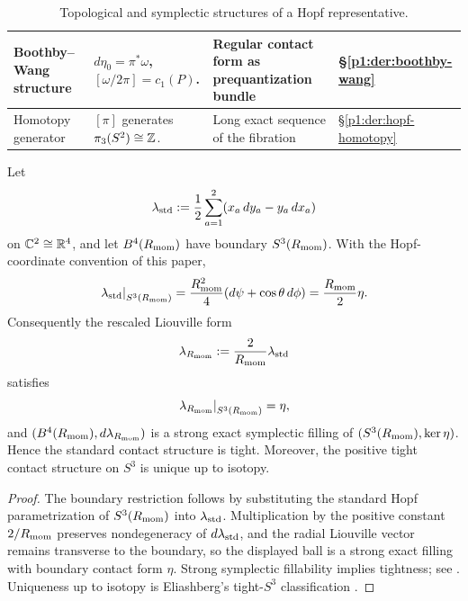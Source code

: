 \documentclass[11pt]{article}
\begin{document}
\begin{table}[p]
\begin{tabular}{|
  L{2.7cm}|
  L{\dimexpr\linewidth-2.7cm-3.5cm-2.25cm-8\arrayrulewidth\relax}|
  L{3.5cm}|
  C{2.25cm}|
}
Boothby--Wang structure
& \(d\eta_0=\pi^*\omega\), \([\omega/2\pi]=c_1(P)\).
& Regular contact form as prequantization bundle
& \S\ref{p1:der:boothby-wang} \\
\hline

Homotopy generator
& \([\pi]\) generates \(\pi_3(S^2)\cong\mathbb{Z}\).
& Long exact sequence of the fibration
& \S\ref{p1:der:hopf-homotopy} \\
\hline

\end{tabular}

\caption[Topological and symplectic structures of a Hopf representative]{Topological and symplectic structures of a Hopf representative.}
\label{p1:tab:canonical-topological}
\endgroup
\end{table}

\begin{proposition}
\label{p1:prop:standard-contact-fill-tight}
Let
\[
  \lambda_{\rm std}
  :=\frac12\sum_{a=1}^{2}(x_a\,dy_a-y_a\,dx_a)
\]
on \(\mathbb{C}^2\cong\mathbb{R}^4\), and let \(B^4(R_{\mathrm{mom}})\) have boundary
\(S^3(R_{\mathrm{mom}})\).  With the Hopf-coordinate convention of this paper,
\[
  \left.\lambda_{\rm std}\right|_{S^3(R_{\mathrm{mom}})}
  =\frac{R_{\mathrm{mom}}^2}{4}
   (d\psi+\cos\theta\,d\phi)
  =\frac{R_{\mathrm{mom}}}{2}\eta.
\]
Consequently the rescaled Liouville form
\[
  \lambda_{R_{\mathrm{mom}}}:=\frac{2}{R_{\mathrm{mom}}}\lambda_{\rm std}
\]
satisfies
\[
  \left.\lambda_{R_{\mathrm{mom}}}\right|_{S^3(R_{\mathrm{mom}})}=\eta,
\]
and \((B^4(R_{\mathrm{mom}}),d\lambda_{R_{\mathrm{mom}}})\) is a strong exact symplectic filling
of \((S^3(R_{\mathrm{mom}}),\ker\eta)\).  Hence the standard contact structure is
tight.  Moreover, the positive tight contact structure on \(S^3\) is unique
up to isotopy.
\end{proposition}

\begin{proof}
The boundary restriction follows by substituting the standard Hopf
parametrization of \(S^3(R_{\mathrm{mom}})\) into \(\lambda_{\rm std}\).  Multiplication
by the positive constant \(2/R_{\mathrm{mom}}\) preserves nondegeneracy of
\(d\lambda_{\rm std}\), and the radial Liouville vector remains transverse
to the boundary, so the displayed ball is a strong exact filling with
boundary contact form \(\eta\).  Strong symplectic fillability implies
tightness; see \cite{geiges2008contact}.  Uniqueness up to isotopy is
Eliashberg's tight-\(S^3\) classification
\cite{Eliashberg1992TightS3}.
\end{proof}
\end{document}
